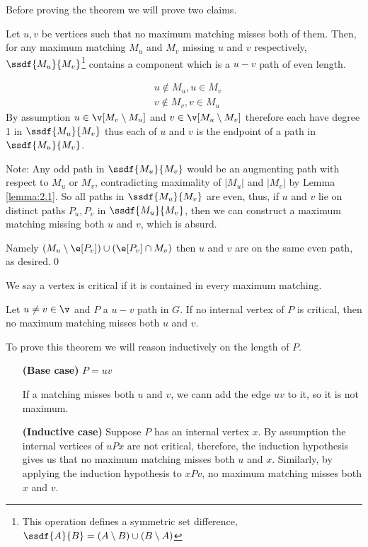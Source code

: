 \begin{prf}
    Before proving the theorem we will prove two claims.
    \begin{customclaim}{1}
    \label{claim:theorem_2.10_1}
        Let $u, v$ be vertices such that no maximum matching misses both of them. Then, for any maximum matching $M_u$ and $M_v$ missing $u$ and $v$ respectively, $\ssdf{M_u}{M_v}$\footnote{This operation defines a symmetric set difference, $\ssdf{A}{B} = (A \setminus B) \cup (B \setminus A)$} contains a component which is a $u - v$ path of even length.
    \end{customclaim}
    \begin{prf}
        \begin{align*}
            &u \notin M_u, u \in M_v\\
            &v \notin M_v, v \in M_u
        \end{align*}
        By assumption $u \in \v[M_v \setminus M_u]$ and $v \in \v[M_u \setminus M_v]$ therefore each have degree 1 in $\ssdf{M_u}{M_v}$ thus each of $u$ and $v$ is the endpoint of a path in $\ssdf{M_u}{M_v}$.

        Note: Any odd path in $\ssdf{M_u}{M_v}$ would be an augmenting path with respect to $M_u$ or $M_v$, contradicting maximality of $|M_u|$ and $|M_v|$ by Lemma \ref{lemma:2.1}. So all paths in $\ssdf{M_u}{M_v}$ are even, thus, if $u$ and $v$ lie on distinct paths $P_u, P_v$ in $\ssdf{M_u}{M_v}$, then we can construct a maximum matching missing both $u$ and $v$, which is absurd.
        
        Namely $(M_u \setminus \e[P_v]) \cup (\e[P_v] \cap M_v)$ then $u$ and $v$ are on the same even path, as desired.\qed
    \end{prf}
    We say a vertex is critical if it is contained in every maximum matching.
    \begin{customclaim}{2}
    \label{claim:theorem_2.10_2}
        Let $u \neq v \in \v$ and $P$ a $u - v$ path in $G$. If no internal vertex of $P$ is critical, then no maximum matching misses both $u$ and $v$.
    \end{customclaim}
    \begin{prf}
        To prove this theorem we will reason inductively on the length of $P$.
        \begin{itemize}
            \item[\textbf{(Base case)}] $P = uv$
            
            If a matching misses both $u$ and $v$, we cann add the edge $uv$ to it, so it is not maximum.
            \item[\textbf{(Inductive case)}] Suppose $P$ has an internal vertex $x$. By assumption the internal vertices of $uPx$ are not critical, therefore, the induction hypothesis gives us that no maximum matching misses both $u$ and $x$. Similarly, by applying the induction hypothesis to $xPv$, no maximum matching misses both $x$ and $v$.
            

\end{itemize}
\end{prf}
\end{prf}
